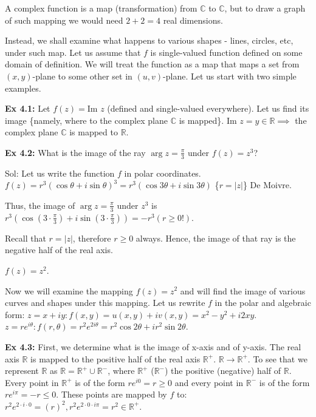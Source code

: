 \documentclass{article}
\begin{document}
A complex function is a map (transformation) from $\mathbb{C}$ to $\mathbb{C}$, but to draw a graph of such mapping we would need $2 + 2 = 4$ real dimensions.

Instead, we shall examine what happens to various shapes - lines, circles, etc, under such map. Let us assume that $f$ is single-valued function defined on some domain of definition. We will treat the function as a map that maps a set from $(x, y)$-plane to some other set in $(u, v)$-plane. Let us start with two simple examples.

\textbf{Ex 4.1:} Let $f(z) = \text{Im } z$ (defined and single-valued everywhere). Let us find its image \{namely, where to the complex plane $\mathbb{C}$ is mapped\}.
$\text{Im } z = y \in \mathbb{R} \implies$ the complex plane $\mathbb{C}$ is mapped to $\mathbb{R}$.

\textbf{Ex 4.2:} What is the image of the ray $\arg z = \frac{\pi}{3}$ under $f(z) = z^3$?

Sol: Let us write the function $f$ in polar coordinates.
$f(z) = r^3(\cos \theta + i\sin \theta)^3 = r^3(\cos 3\theta + i\sin 3\theta)$ \{$r = \vert z\vert $\} De Moivre.

Thus, the image of $\arg z = \frac{\pi}{3}$ under $z^3$ is $r^3(\cos(3 \cdot \frac{\pi}{3}) + i\sin(3 \cdot \frac{\pi}{3})) = -r^3 (r \geq 0!)$.

Recall that $r = \vert z\vert $, therefore $r \geq 0$ always. Hence, the image of that ray is the negative half of the real axis.

$f(z) = z^2$.

Now we will examine the mapping $f(z) = z^2$ and will find the image of various curves and shapes under this mapping. Let us rewrite $f$ in the polar and algebraic form:
$z = x + iy: f(x, y) = u(x, y) + iv(x, y) = x^2 - y^2 + i2xy$.
$z = re^{i\theta}: f(r, \theta) = r^2 e^{2i\theta} = r^2 \cos 2\theta + ir^2 \sin 2\theta$.

\textbf{Ex 4.3:} First, we determine what is the image of x-axis and of y-axis. The real axis $\mathbb{R}$ is mapped to the positive half of the real axis $\mathbb{R}^+$. $\mathbb{R} \to \mathbb{R}^+$. To see that we represent $\mathbb{R}$ as $\mathbb{R} = \mathbb{R}^+ \cup \mathbb{R}^-$, where $\mathbb{R}^+$ ($\mathbb{R}^-$) the positive (negative) half of $\mathbb{R}$. Every point in $\mathbb{R}^+$ is of the form $re^{i0} = r \geq 0$ and every point in $\mathbb{R}^-$ is of the form $re^{i\pi} = -r \leq 0$. These points are mapped by $f$ to: $r^2 e^{2 \cdot i \cdot 0} = (r)^2, r^2 e^{2 \cdot 0 \cdot i\pi} = r^2 \in \mathbb{R}^+$.
\end{document}
